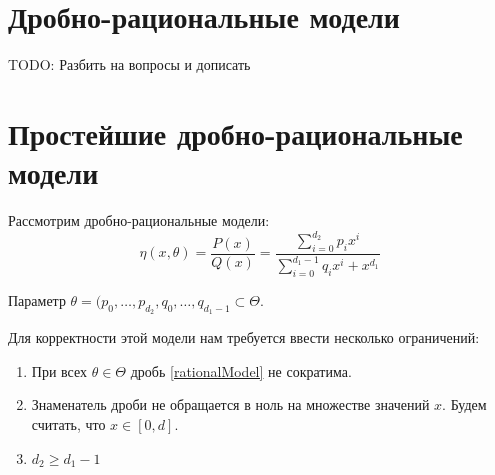 \section{Дробно-рациональные модели}

{\color{blue} TODO: Разбить на вопросы и дописать}
\section{Простейшие дробно-рациональные модели}
Рассмотрим дробно-рациональные модели:
\begin{equation}
\label{rationalModel}
\eta(x, \theta) = \frac{P(x)}{Q(x)} = \frac{\sum\limits_{i=0}^{d_2}p_ix^i}{\sum\limits_{i=0}^{d_1-1}q_ix^i + x^{d_1}}
\end{equation}

Параметр $\theta = (p_0, …, p_{d_2}, q_0, …, q_{d_1-1}\subset \Theta$.

Для корректности этой модели нам требуется ввести несколько ограничений:
\begin{enumerate}
\item При всех $\theta \in \Theta$ дробь \eqref{rationalModel} не сократима. 
\item Знаменатель дроби не обращается в ноль на множестве значений $x$. Будем считать, что $x \in [0,d]$. 
\item $d_2 \geq d_1 - 1$
\end{enumerate}


